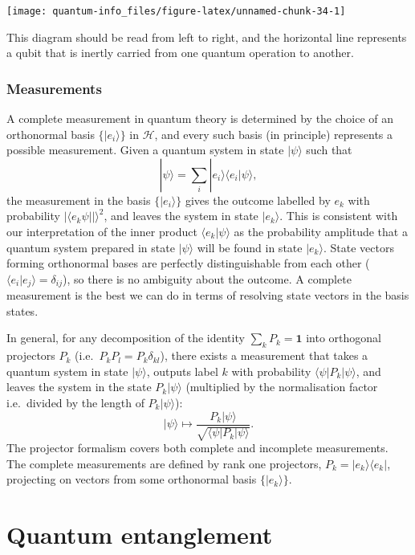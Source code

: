 \documentclass[fleqn]{article}
\let\oldsection\section
\renewcommand\section{\clearpage\oldsection}
\begin{document}
\begin{center}\texttt{[image: quantum-info\_files/figure-latex/unnamed-chunk-34-1]} \end{center}

This diagram should be read from left to right, and the horizontal line represents a qubit that is inertly carried from one quantum operation to another.

\hypertarget{measurements}{%
\subsubsection{Measurements}\label{measurements}}

A complete measurement in quantum theory is determined by the choice of an orthonormal basis \(\{|e_i\rangle\}\) in \(\mathcal{H}\), and every such basis (in principle) represents a possible measurement.
Given a quantum system in state \(|\psi\rangle\) such that
\[
  |\psi\rangle = \sum_i |e_i\rangle\langle e_i|\psi\rangle,
\]
the measurement in the basis \(\{|e_i\rangle\}\) gives the outcome labelled by \(e_k\) with probability \(|\langle e_k\psi||\rangle^2\), and leaves the system in state \(|e_k\rangle\).
This is consistent with our interpretation of the inner product \(\langle e_k|\psi\rangle\) as the probability amplitude that a quantum system prepared in state \(|\psi\rangle\) will be found in state \(|e_k\rangle\).
State vectors forming orthonormal bases are perfectly distinguishable from each other (\(\langle e_i|e_j\rangle=\delta_{ij}\)), so there is no ambiguity about the outcome.
A complete measurement is the best we can do in terms of resolving state vectors in the basis states.

In general, for any decomposition of the identity \(\sum_k P_k=\mathbf{1}\) into orthogonal projectors \(P_k\) (i.e.~\(P_kP_l = P_k\delta_{kl}\)), there exists a measurement that takes a quantum system in state \(|\psi\rangle\), outputs label \(k\) with probability \(\langle\psi|P_k|\psi\rangle\), and leaves the system in the state \(P_k|\psi\rangle\) (multiplied by the normalisation factor i.e.~divided by the length of \(P_k|\psi\rangle\)):
\[
  |\psi\rangle
  \mapsto
  \frac{P_k|\psi\rangle}{\sqrt{\langle\psi|P_k|\psi\rangle}}.
\]
The projector formalism covers both complete and incomplete measurements.
The complete measurements are defined by rank one projectors, \(P_k=|e_k\rangle\langle e_k|\), projecting on vectors from some orthonormal basis \(\{|e_k\rangle\}\).

\hypertarget{chapter5}{%
\section{Quantum entanglement}\label{chapter5}}
\end{document}
